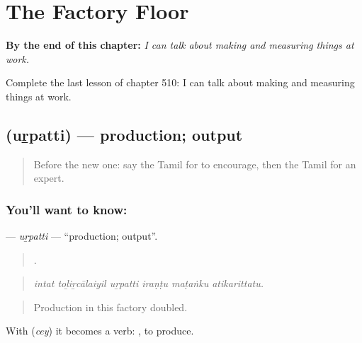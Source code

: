 
\chapter{The Factory Floor}
\label{ch:ta-the-factory-floor}

\begin{chapteropening}
\textbf{By the end of this chapter:} \emph{I can talk about making and measuring things at work.}

Complete the last lesson of chapter 510: I can talk about making and measuring things at work.
\end{chapteropening}

\section[\texorpdfstring{\ta{உற்பத்தி} (uṟpatti)}{உற்பத்தி (uṟpatti)}]{ (uṟpatti) — production; output}

\label{lesson:TA-C510-urpatti}



\begin{quote}
Before the new one: say the Tamil for to encourage, then the Tamil for an expert.
\end{quote}

\subsection*{You'll want to know: }
\textbf{} — \emph{uṟpatti} — \textquotedblleft{}production; output\textquotedblright{}.

\begin{quote}
     .
\end{quote}

\begin{quote}
\emph{intat toḻiṟcālaiyil uṟpatti iraṇṭu maṭaṅku atikarittatu.}
\end{quote}

\begin{quote}
Production in this factory doubled.
\end{quote}

With  (\emph{cey}) it becomes a verb:  , to produce.

